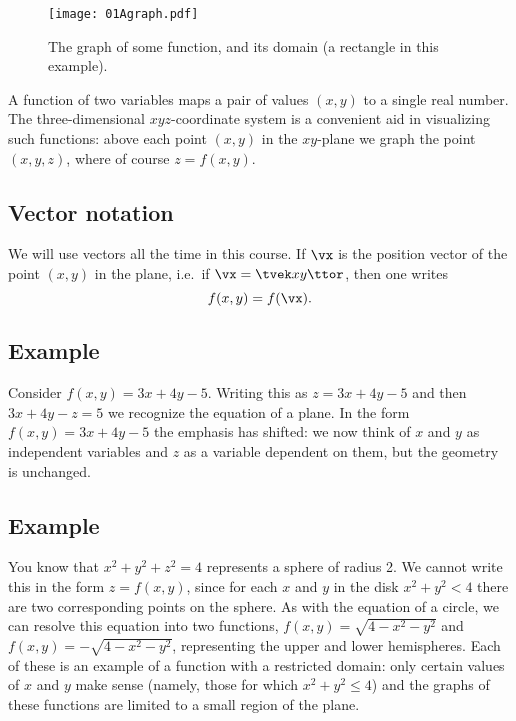\begin{figure}[h]
  \begin{center}
    \texttt{[image: 01Agraph.pdf]}
  \end{center}
  \caption{The graph of some function, and its domain (a rectangle in
  this example).}
  \label{fig:01Agraph}
\end{figure}

A function of two variables maps a pair of values $(x,y)$ to a
single real number.  The three-dimensional $xyz$-coordinate system 
is a convenient aid in visualizing such functions: above
each point $(x,y)$ in the $xy$-plane we graph the point $(x,y,z)$,
where of course $z=f(x,y)$. 

\subsection{Vector notation} We will use vectors all the time in this    %
course.  If $\vx$ is the position vector of the point $(x, y)$ in the
plane, i.e.\ if $\vx = \tvek x\\ y\ttor$, then one writes
\[
f(x, y)  = f(\vx).
\]

\subsection{Example}\label{sec:example-of-a-function1} Consider    %
$f(x,y)=3x+4y-5$. Writing this as $z=3x+4y-5$ and then $3x+4y-z=5$ we
recognize the equation of a plane.  In the form $f(x,y)=3x+4y-5$ the
emphasis has shifted: we now think of $x$ and $y$ as independent
variables and $z$ as a variable dependent on them, but the geometry is
unchanged.

\subsection{Example}\label{sec:example-of-a-function2} You know that    %
$x^2+y^2+z^2=4$ represents a sphere of radius 2. We cannot write this
in the form $z=f(x,y)$, since for each $x$ and $y$ in the disk
$x^2+y^2<4$ there are two corresponding points on the sphere. As with
the equation of a circle, we can resolve this equation into two
functions, $f(x,y)=\sqrt{4-x^2-y^2}$ and $f(x,y)=-\sqrt{4-x^2-y^2}$,
representing the upper and lower hemispheres. Each of these is an
example of a function with a restricted domain: only certain values of
$x$ and $y$ make sense (namely, those for which $x^2+y^2\le 4$) and
the graphs of these functions are limited to a small region of the
plane.


